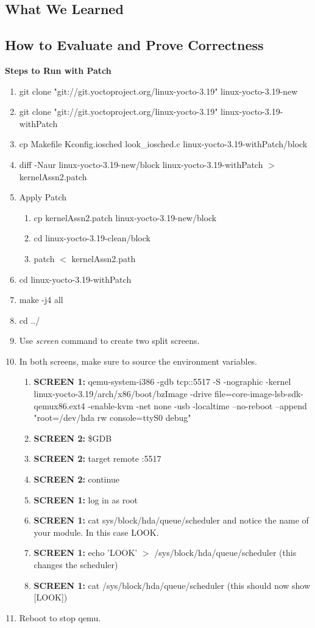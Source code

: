 \documentclass[draftclsnofoot, onecolumn, 10pt, compsoc]{IEEEtran}
\begin{document}
		\subsection{What We Learned}
	
		\subsection{How to Evaluate and Prove Correctness}
			\textbf{Steps to Run with Patch}
			\begin{enumerate}
				\item git clone "git://git.yoctoproject.org/linux-yocto-3.19" linux-yocto-3.19-new
				\item git clone "git://git.yoctoproject.org/linux-yocto-3.19" linux-yocto-3.19-withPatch
				\item cp Makefile Kconfig.iosched look\_iosched.c linux-yocto-3.19-withPatch/block
				\item diff -Naur linux-yocto-3.19-new/block linux-yocto-3.19-withPatch $>$ kernelAssn2.patch
				\item Apply Patch
				\begin{enumerate}
					\item cp kernelAssn2.patch linux-yocto-3.19-new/block
					\item cd linux-yocto-3.19-clean/block
					\item patch $<$ kernelAssn2.path
				\end{enumerate}
				\item cd linux-yocto-3.19-withPatch
				\item make -j4 all
				\item cd ../
				\item Use \textit{screen} command to create two split screens.
				\item In both screens, make sure to source the environment variables.
				\begin{enumerate}
					\item \textbf{SCREEN 1:} qemu-system-i386 -gdb tcp::5517 -S -nographic -kernel linux-yocto-3.19/arch/x86/boot/bzImage -drive file=core-image-lsb-sdk-qemux86.ext4 -enable-kvm -net none -usb -localtime --no-reboot --append "root=/dev/hda rw console=ttyS0 debug"
					\item \textbf{SCREEN 2:} \$GDB
					\item \textbf{SCREEN 2:} target remote :5517
					\item \textbf{SCREEN 2:} continue
					\item \textbf{SCREEN 1:} log in as root
					\item \textbf{SCREEN 1:} cat sys/block/hda/queue/scheduler and notice the name of your module. In this case LOOK.
					\item \textbf{SCREEN 1:} echo 'LOOK' $>$ /sys/block/hda/queue/scheduler (this changes the scheduler)
					\item \textbf{SCREEN 1:} cat /sys/block/hda/queue/scheduler (this should now show [LOOK])
				\end{enumerate}
				\item Reboot to stop qemu.
			\end{enumerate}
	
	
\end{document}
